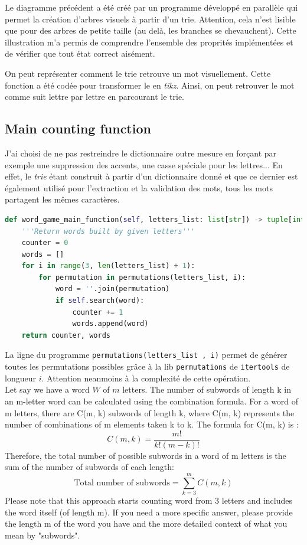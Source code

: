 \documentclass[10pt,a4paper,hidelinks]{article}
\begin{document}
Le diagramme précédent a été créé par un programme développé en parallèle qui permet la création d'arbres visuels à partir d'un trie. Attention, cela n'est lisible que pour des arbres de petite taille (au delà, les branches se chevauchent). Cette illustration m'a permis de comprendre l'ensemble des proprités implémentées et de vérifier que tout état correct aisément.

On peut représenter comment le trie retrouve un mot visuellement. Cette fonction a été codée pour transformer le  en \textit{tikz}. Ainsi, on peut retrouver le mot comme suit lettre par lettre en parcourant le trie.\\



\subsection{Main counting function}
J'ai choisi de ne pas restreindre le dictionnaire outre mesure en forçant par exemple une suppression des accents, une casse spéciale pour les lettres... En effet, le \textit{trie} étant construit à partir d'un dictionnaire donné et que ce dernier est également utilisé pour l'extraction et la validation des mots, tous les mots partagent les mêmes caractères.

\begin{lstlisting}[language=Python, caption=Test all permutations]
def word_game_main_function(self, letters_list: list[str]) -> tuple[int, list[str]]:
    '''Return words built by given letters'''
    counter = 0
    words = []
    for i in range(3, len(letters_list) + 1):
        for permutation in permutations(letters_list, i):
            word = ''.join(permutation)
            if self.search(word):
                counter += 1
                words.append(word)
    return counter, words
\end{lstlisting}

La ligne du programme \verb|permutations(letters_list , i)| permet de générer toutes les permutations possibles grâce à la lib \verb|permutations| de \verb|itertools| de longueur $i$. Attention neanmoins à la complexité de cette opération.\\

Let say we have a word $W$ of $m$ letters.
The number of subwords of length k in an m-letter word can be calculated using the combination formula. For a word of m letters, there are C(m, k) subwords of length k, where C(m, k) represents the number of combinations of m elements taken k to k. The formula for C(m, k) is :
$$C(m, k) = \dfrac{m!}{k!(m - k)!}$$
Therefore, the total number of possible subwords in a word of m letters is the sum of the number of subwords of each length:
\begin{equation}
\text{Total number of subwords} = \sum_{k=3}^{m}C(m, k)
\label{eq:number_of_combination}
\end{equation}
Please note that this approach starts counting word from 3 letters and includes the word itself (of length m).
If you need a more specific answer, please provide the length m of the word you have and the more detailed context of what you mean by "subwords".

\end{document}
